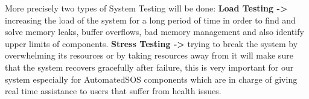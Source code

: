 \noindent
More precisely two types of System Testing will be done:
\medbreak
\noindent
\textbf{Load Testing ->} increasing the load of the system for a long period of time in order to find and solve memory leaks, buffer overflows, bad memory management and also identify upper limits of components.
\medbreak
\noindent
\textbf{Stress Testing ->} trying to break the system by overwhelming its resources or by taking resources away from it will make sure that the system recovers gracefully after failure, this is very important for our system especially for AutomatedSOS components which are in charge of giving real time assistance to users that suffer from health issues.




